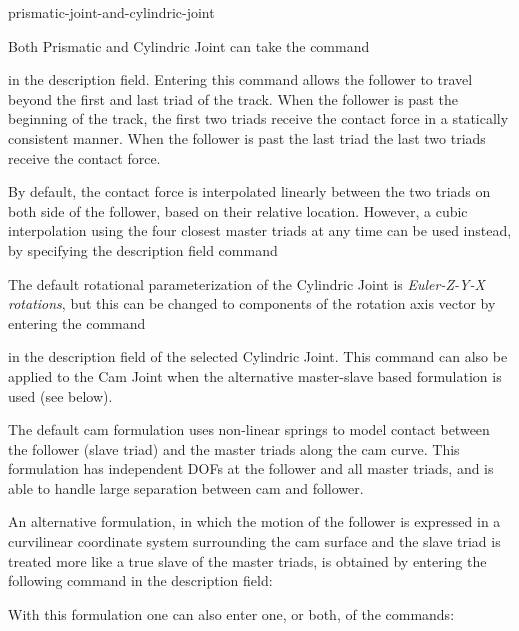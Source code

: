            {prismatic-joint-and-cylindric-joint}

Both Prismatic and Cylindric Joint can take the command


\noindent
in the description field. Entering this command allows the follower to
travel beyond the first and last triad of the track. When the follower
is past the beginning of the track, the first two triads receive the
contact force in a statically consistent manner. When the follower is
past the last triad the last two triads receive the contact force.

By default, the contact force is interpolated linearly between the two
triads on both side of the follower, based on their relative location.
However, a cubic interpolation using the four closest master triads at
any time can be used instead, by specifying the description field command


The default rotational parameterization of the Cylindric Joint is
{\sl Euler-Z-Y-X rotations}, but this can be changed to components of the
rotation axis vector by entering the command


\noindent
in the description field of the selected Cylindric Joint. This command
can also be applied to the Cam Joint when the alternative master-slave
based formulation is used (see  below).



The default cam formulation uses non-linear springs to model contact
between the follower (slave triad) and the master triads along the cam curve.
This formulation has independent DOFs at the follower and all master triads,
and is able to handle large separation between cam and follower.

An alternative formulation, in which the motion of the follower is
expressed in a curvilinear coordinate system surrounding the cam surface
and the slave triad is treated more like a true slave of the master triads,
is obtained by entering the following command in the description field:


\noindent
With this formulation one can also enter one, or both, of the commands:

